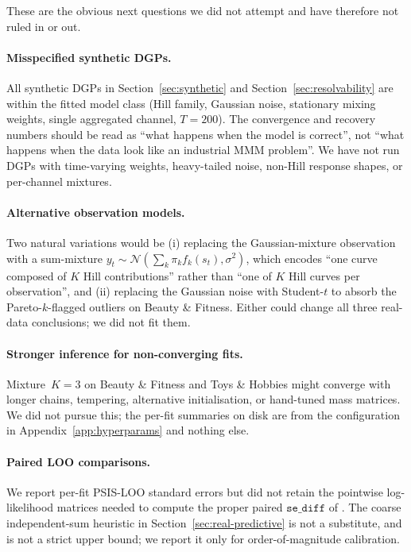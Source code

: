 \documentclass[11pt]{article}
\begin{document}
These are the obvious next questions we did not attempt and have therefore not ruled in or out.

\paragraph{Misspecified synthetic DGPs.} All synthetic DGPs in Section~\ref{sec:synthetic} and Section~\ref{sec:resolvability} are within the fitted model class (Hill family, Gaussian noise, stationary mixing weights, single aggregated channel, $T=200$). The convergence and recovery numbers should be read as ``what happens when the model is correct'', not ``what happens when the data look like an industrial MMM problem''. We have not run DGPs with time-varying weights, heavy-tailed noise, non-Hill response shapes, or per-channel mixtures.

\paragraph{Alternative observation models.} Two natural variations would be (i) replacing the Gaussian-mixture observation with a sum-mixture $y_t \sim \mathcal{N}(\sum_k \pi_k f_k(s_t), \sigma^2)$, which encodes ``one curve composed of $K$ Hill contributions'' rather than ``one of $K$ Hill curves per observation'', and (ii) replacing the Gaussian noise with Student-$t$ to absorb the Pareto-$k$-flagged outliers on Beauty \& Fitness. Either could change all three real-data conclusions; we did not fit them.

\paragraph{Stronger inference for non-converging fits.} Mixture~$K=3$ on Beauty \& Fitness and Toys \& Hobbies might converge with longer chains, tempering, alternative initialisation, or hand-tuned mass matrices. We did not pursue this; the per-fit summaries on disk are from the configuration in Appendix~\ref{app:hyperparams} and nothing else.

\paragraph{Paired LOO comparisons.} We report per-fit PSIS-LOO standard errors but did not retain the pointwise log-likelihood matrices needed to compute the proper paired $\mathtt{se\_diff}$ of \citet{vehtari2017loo}. The coarse independent-sum heuristic in Section~\ref{sec:real-predictive} is not a substitute, and is not a strict upper bound; we report it only for order-of-magnitude calibration.
\end{document}
